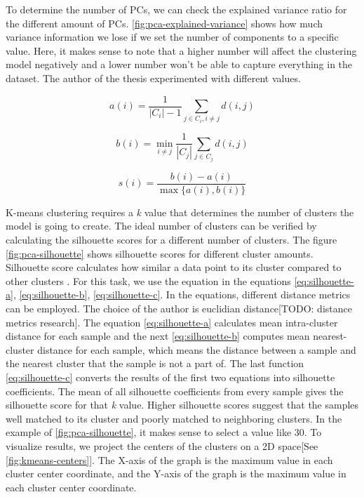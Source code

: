 To determine the number of PCs, we can check the explained variance ratio for the different amount of PCs. \autoref{fig:pca-explained-variance} shows how much variance information we lose if we set the number of components to a specific value. Here, it makes sense to note that a higher number will affect the clustering model negatively and a lower number won't be able to capture everything in the dataset. The author of the thesis experimented with different values.

\begin{equation}
a(i)=\frac{1}{\left|C_{i}\right|-1} \sum_{j \in C_{i}, i \neq j} d(i, j)
\label{eq:silhouette-a}
\end{equation}

\begin{equation}
b(i)=\min _{i \neq j} \frac{1}{\left|C_{j}\right|} \sum_{j \in C_{j}} d(i, j)
\label{eq:silhouette-b}
\end{equation}

\begin{equation}
s(i)=\frac{b(i)-a(i)}{\max \{a(i), b(i)\}}
\label{eq:silhouette-c}
\end{equation}

K-means clustering requires a \textit{k} value that determines the number of clusters the model is going to create. The ideal number of clusters can be verified by calculating the silhouette scores for a different number of clusters. The figure \ref{fig:pca-silhouette} shows silhouette scores for different cluster amounts. Silhouette score calculates how similar a data point to its cluster compared to other clusters \parencite{rousseeuw1987silhouettes}. For this task, we use the equation in the equations \ref{eq:silhouette-a}, \ref{eq:silhouette-b}, \ref{eq:silhouette-c}. In the equations, different distance metrics can be employed. The choice of the author is euclidian distance[TODO: distance metrics research].  The equation \ref{eq:silhouette-a} calculates mean intra-cluster distance for each sample and the next \ref{eq:silhouette-b} computes mean nearest-cluster distance for each sample, which means the distance between a sample and the nearest cluster that the sample is not a part of. The last function \ref{eq:silhouette-c} converts the results of the first two equations into silhouette coefficients. The mean of all silhouette coefficients from every sample gives the silhouette score for that \textit{k} value. Higher silhouette scores suggest that the samples well matched to its cluster and poorly matched to neighboring clusters. In the example of \ref{fig:pca-silhouette}, it makes sense to select a value like 30. To visualize results, we project the centers of the clusters  on a 2D space[See \ref{fig:kmeans-centers}]. The X-axis of the graph is the maximum value in each cluster center coordinate, and the Y-axis of the graph is the maximum value in each cluster center coordinate.

